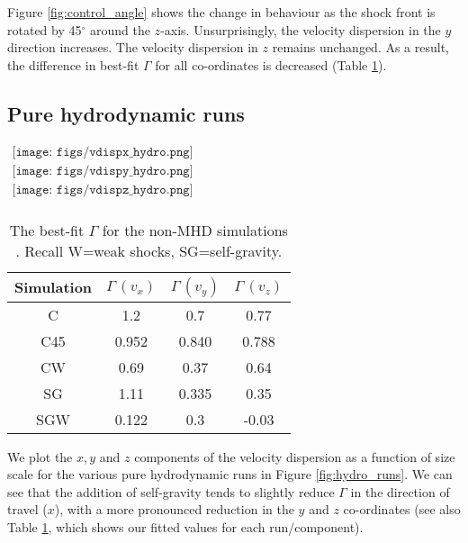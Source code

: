 \documentclass[a4paper,fleqn,usenatbib]{mnras}
\begin{document}
\noindent Figure \ref{fig:control_angle} shows the change in behaviour as the shock front is rotated by 45$^\circ$ around the $z$-axis.  Unsurprisingly, the velocity dispersion in the $y$ direction increases.  The velocity dispersion in $z$ remains unchanged.  As a result, the difference in best-fit $\Gamma$ for all co-ordinates is decreased (Table \ref{tab:hydro_fits}). 

\subsection{Pure hydrodynamic runs}

\begin{figure*}
\begin{center}
$\begin{array}{c}
\texttt{[image: figs/vdispx\_hydro.png]} \\
\texttt{[image: figs/vdispy\_hydro.png]} \\
\texttt{[image: figs/vdispz\_hydro.png]} \\
\end{array}$
\end{center}
\caption{The velocity dispersion as a function of size scale in the post-shock gas for the $x$ component (top) $y$ component (middle) and $z$ component (bottom), for the pure hydrodynamic simulations.  All are measured at $t=0.5$ units. }
\label{fig:hydro_runs}
\end{figure*}

\begin{table}
\centering
  \caption{The best-fit $\Gamma$ for the non-MHD simulations \label{tab:hydro_fits}. Recall W=weak shocks, SG=self-gravity.}
  \begin{tabular}{c | ccc}
  \hline
  \hline
   Simulation  &  $\Gamma \,(v_x)$ & $\Gamma \,(v_y)$& $\Gamma \,(v_z)$ \\
   \hline
   C & 1.2 & 0.7 & 0.77 \\
   C45 & 0.952 & 0.840 & 0.788 \\
   CW & 0.69 & 0.37 & 0.64 \\
   SG & 1.11 & 0.335 & 0.35 \\
   SGW & 0.122 & 0.3 & -0.03 \\
 \hline
  \hline
\end{tabular}
\end{table}

\noindent We plot the $x,y$ and $z$ components of the velocity dispersion as a function of size scale for the various pure hydrodynamic runs in Figure \ref{fig:hydro_runs}.  We can see that the addition of self-gravity tends to slightly reduce $\Gamma$ in the direction of travel ($x$), with a more pronounced reduction in the $y$ and $z$ co-ordinates (see also Table \ref{tab:hydro_fits}, which shows our fitted values for each run/component).
\end{document}
